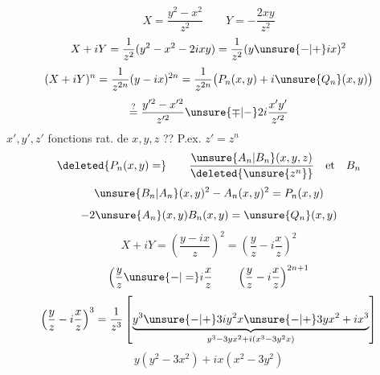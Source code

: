 \[X=\frac{y^2-x^2}{z^2}\qquad Y=-\frac{2xy}{z^2}\]
\[
X+iY=\frac1{z^2}(y^2-x^2-2ixy)=\frac1{z^2}(y\unsure{-|+}ix)^2
\]
\[
(X+iY)^n=\frac1{z^{2n}}(y-ix)^{2n}=\frac1{z^{2n}}\bigl(P_n(x,y)+i\unsure{Q_n}(x,y)\bigr)
\]
\[
\stackrel{?}{=}\frac{y'^2-x'^2}{z'^2}\unsure{\mp|-}2i\frac{x'y'}{z'^2}
\]
$x',y',z'$ fonctions rat. de $x,y,z$ ?? P.ex. $z'=z^n$
\[
\deleted{P_n(x,y)=}\qquad\frac{\unsure{A_n|B_n}(x,y,z)}{\deleted{\unsure{z^n}}}\quad\text{et}\quad B_n
\]
\[
\unsure{B_n|A_n}(x,y)^2-A_n(x,y)^2=P_n(x,y)
\]
\[
-2\unsure{A_n}(x,y)B_n(x,y)=\unsure{Q_n}(x,y)
\]
\[
X+iY=\left(\frac{y-ix}{z}\right)^2=\left(\frac yz-i\frac xz\right)^2
\]
\[
\left(\frac yz\unsure{-|=}i\frac xz\right.
\qquad
\left(\frac yz-i\frac xz\right)^{2n+1}
\]
\[
\left(\frac yz-i\frac xz\right)^3
=\frac1{z^3}\left[
\underbrace{y^3\unsure{-|+}3iy^2x\unsure{-|+}3yx^2+ix^3}_{y^3-3yx^2+i(x^3-3y^2x)}
\right]
\]
\[
y(y^2-3x^2)+ix(x^2-3y^2)
\]
